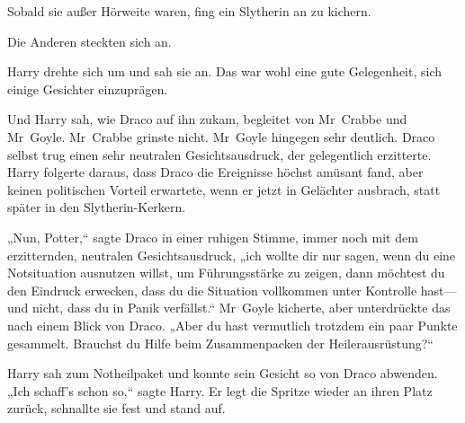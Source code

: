 Sobald sie außer Hörweite waren, fing ein Slytherin an zu kichern.

Die Anderen steckten sich an.

Harry drehte sich um und sah sie an. Das war wohl eine gute Gelegenheit, sich einige Gesichter einzuprägen.

Und Harry sah, wie Draco auf ihn zukam, begleitet von Mr~Crabbe und Mr~Goyle. Mr~Crabbe grinste nicht. Mr~Goyle hingegen sehr deutlich. Draco selbst trug einen sehr neutralen Gesichtsausdruck, der gelegentlich erzitterte. Harry folgerte daraus, dass Draco die Ereignisse höchst amüsant fand, aber keinen politischen Vorteil erwartete, wenn er jetzt in Gelächter ausbrach, statt später in den Slytherin-Kerkern.

„Nun, Potter,“ sagte Draco in einer ruhigen Stimme, immer noch mit dem erzitternden, neutralen Gesichtsausdruck, „ich wollte dir nur sagen, wenn du eine Notsituation ausnutzen willst, um Führungsstärke zu zeigen, dann möchtest du den Eindruck erwecken, dass du die Situation vollkommen unter Kontrolle hast—und nicht, dass du in Panik verfällst.“ Mr~Goyle kicherte, aber unterdrückte das nach einem Blick von Draco. „Aber du hast vermutlich trotzdem ein paar Punkte gesammelt. Brauchst du Hilfe beim Zusammenpacken der Heilerausrüstung?“

Harry sah zum Notheilpaket und konnte sein Gesicht so von Draco abwenden. „Ich schaff’s schon so,“ sagte Harry. Er legt die Spritze wieder an ihren Platz zurück, schnallte sie fest und stand auf.

